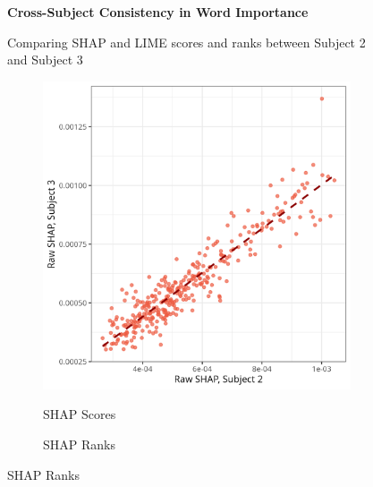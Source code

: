\documentclass[10pt,letterpaper]{article}
\begin{document}
\begin{figure}[ht]
    \centering

    \parbox{\textwidth}{\centering 
        \fontsize{13pt}{13pt}\selectfont \textbf{Cross-Subject Consistency in Word Importance}  
        
        {\fontsize{11pt}{13pt}\selectfont Comparing SHAP and LIME scores and ranks between Subject 2 and Subject 3} 
    }
    
    \begin{subfigure}[t]{0.22\textwidth}
        \centering
        \caption{SHAP Scores}
        \includegraphics[width=\textwidth]{figs/scatter_buck_shap_raw.png}
        \label{subfig:scatter_buck_shap_raw}
    \end{subfigure}
    \hfill
    \begin{subfigure}[t]{0.22\textwidth}
        \centering
        \caption{SHAP Ranks}

\end{subfigure}
\end{figure}
\end{document}
